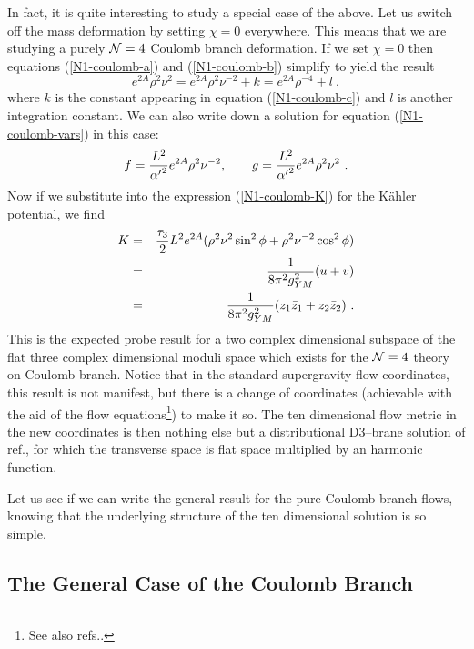 \documentclass[a4paper,12pt]{article}
\newcommand{\labell}[1]{\label{#1}}
\newcommand{\reef}[1]{(\ref{#1})}
\begin{document}
In fact, it is quite interesting to study a special case of the above.
Let us switch off the mass deformation by setting $\chi = 0$
everywhere. This means that we are studying a purely ${\cal N} = 4$
Coulomb branch deformation.  If we set $\chi = 0$ then equations
\reef{N1-coulomb-a} and \reef{N1-coulomb-b} simplify to yield the
result
\begin{equation}
  e^{2A} \rho^2 \nu^2 =  e^{2A} \rho^2 \nu^{-2} + k = e^{2A} \rho^{-4} + l\ ,
\end{equation}
where $k$ is the constant appearing in equation \reef{N1-coulomb-c}
and $l$ is another integration constant.  We can also write down a
solution for equation \reef{N1-coulomb-vars} in this case:
\begin{equation}
  f =  {L^2 \over {\alpha'}^2} e^{2A} \rho^2 \nu^{-2}, \qquad  g = {L^2 \over {\alpha'}^2} e^{2A}  \rho^2 \nu^2\  .
\end{equation}
Now if we substitute into the expression \reef{N1-coulomb-K} for the
K\"ahler potential, we find
\begin{eqnarray}
  K &=& {\tau_3 \over 2} L^2 e^{2A} ( \rho^2 \nu^2 \sin^2\phi + \rho^2 \nu^{-2} \cos^2\phi ) \nonumber \\
    &=& \frac{1}{8 \pi^2 g_{YM}^2} (u + v) \nonumber \\
    &=& \frac{1}{8 \pi^2 g_{YM}^2} (z_1 \bar{z}_1 + z_2 \bar{z}_2)\ .
\labell{flatspace}
\end{eqnarray}
This is the expected probe result\cite{primer} for a two complex
dimensional subspace of the flat three complex dimensional moduli
space which exists for the ${\cal N} = 4$ theory on Coulomb branch.
Notice that in the standard supergravity flow coordinates, this result
is not manifest, but there is a change of coordinates (achievable with
the aid of the flow equations\footnote{See also
  refs.\cite{beh,freed2,bakas}.})  to make it so.  The ten dimensional
flow metric in the new coordinates is then nothing else but a
distributional D3--brane solution of ref.\cite{kraus}, for which the
transverse space is flat space multiplied by an harmonic function.

Let us see if we can write the general result for the pure Coulomb branch
flows, knowing that the underlying structure of the ten dimensional
solution is so simple.

\subsection{The General Case of the Coulomb Branch}
\end{document}
